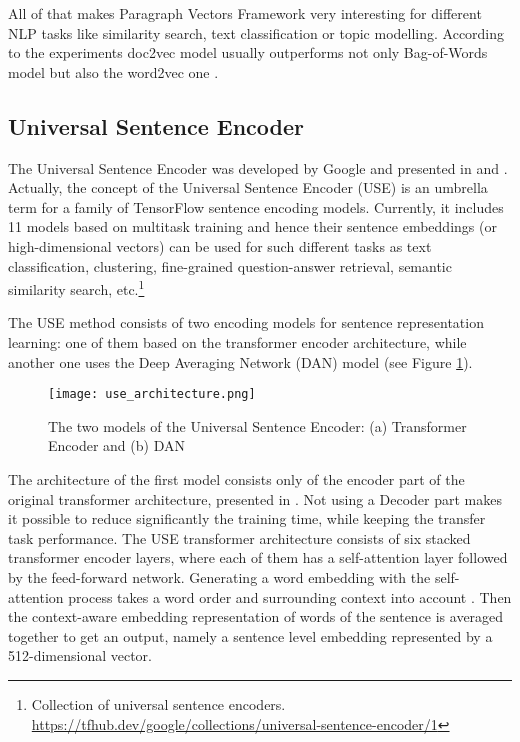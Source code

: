\documentclass[fontsize=12pt,a4paper,twoside,openany]{scrbook}
\begin{document}
All of that makes Paragraph Vectors Framework very interesting for different NLP tasks like similarity search, text classification or topic modelling. According to the experiments doc2vec model usually outperforms not only Bag-of-Words model but also the word2vec one \parencite[see][]{Lau16, Le14}.

\subsection{Universal Sentence Encoder}
\label{sec:muse}

The Universal Sentence Encoder was developed by Google and presented in \parencite{Cer18a} and \parencite{Cer18b}. Actually, the concept of the Universal Sentence Encoder (USE) is an umbrella term for a family of TensorFlow sentence encoding models. Currently, it  includes 11 models based on multitask training and hence their sentence embeddings (or high-dimensional vectors) can be used for such different tasks as text classification, clustering,  fine-grained question-answer retrieval, semantic similarity search, etc.\footnote{Collection of universal sentence encoders. \url{https://tfhub.dev/google/collections/universal-sentence-encoder/1}}

The USE method consists of two encoding models for sentence representation learning: one of them based on the transformer encoder architecture, while another one uses the Deep Averaging Network (DAN) model \parencite{Cer18a} (see Figure \ref{fig:use_architecture}).

\begin{figure}[h]
\centering
\texttt{[image: use\_architecture.png]}
\caption{The two models of the Universal Sentence Encoder: (a) Transformer Encoder and (b) DAN}
\label{fig:use_architecture}
\end{figure}

The architecture of the first model consists only of the encoder part of the original transformer architecture, presented in \parencite{Vaswani17}. Not using a Decoder part makes it possible to reduce significantly the training time, while keeping the transfer task performance. The USE transformer architecture consists of six stacked transformer encoder layers, where each of them has a self-attention layer followed by the feed-forward network. Generating a word embedding with the self-attention process takes a word order and surrounding context into account \parencite{Cer18a}. Then the context-aware embedding representation of words of the sentence is averaged together to get an output, namely a sentence level embedding represented by a 512-dimensional vector. 
\end{document}
